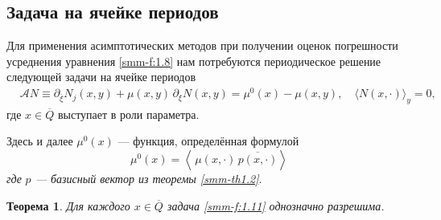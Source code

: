 \documentclass[a4paper,12pt]{article}
\newtheorem{theorem}{Теорема}[section]
\theoremstyle{definition}
\begin{document}
	\subsection{Задача на ячейке периодов}
	Для применения асимптотических методов при получении оценок погрешности усреднения
	уравнения \eqref{smm-f:1.8} нам потребуются периодическое
	решение следующей задачи на ячейке периодов
	\begin{equation}\label{smm-f:1.11}
		\begin{aligned}
			&\mathcal{A}N\equiv \partial_{\bar\xi}N_j(x,y)+\mu(x,y)\,\partial_\xi N(x,y) =\mu^0(x)-\mu(x,y), \quad \langle N(x,\cdot)\rangle_y=0,
				\end{aligned}
	\end{equation}
	где $x\in \overline Q$ выступает в роли параметра.

	
	{Здесь и далее  $\mu^0(x)$ --- функция, определённая
		формулой}
		\begin{equation*}
		\mu^0(x)=\left<\,\mu(x,\cdot)\,\overline{p(x,\cdot)}\right>
	\end{equation*}
	\textit{где} 	\textit{$p$ ---  базисный вектор из теоремы {\ref{smm-th1.2}}}.
	
	\begin{theorem}\label{smm-th1.3}
	Для каждого $x\in\overline{Q}$ задача \eqref{smm-f:1.11}
		однозначно разрешима.
	\end{theorem}
\end{document}

